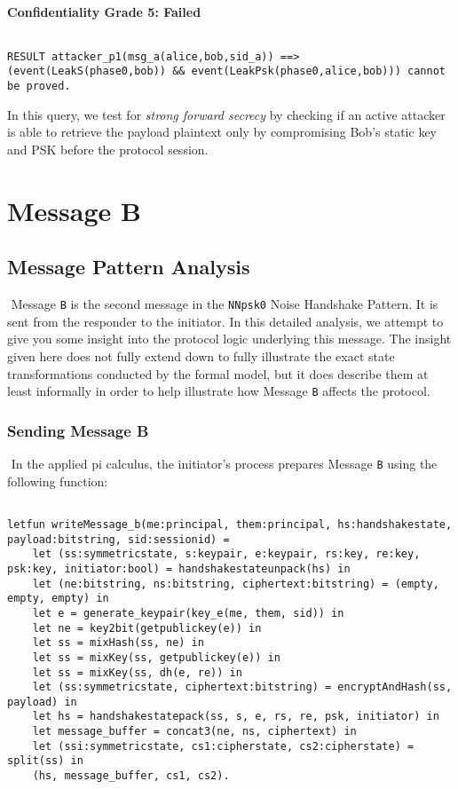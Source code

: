 \paragraph{Confidentiality Grade 5: Failed}$ $
\begin{lstlisting}
RESULT attacker_p1(msg_a(alice,bob,sid_a)) ==> (event(LeakS(phase0,bob)) && event(LeakPsk(phase0,alice,bob))) cannot be proved.
\end{lstlisting}

In this query, we test for \emph{strong forward secrecy} by checking if an active attacker is able to retrieve the payload plaintext only by compromising Bob's static key and PSK before the protocol session.


\section{ Message B}

\subsection{Message Pattern Analysis}$ $
Message \texttt{B} is the second message in the \texttt{NNpsk0} Noise Handshake Pattern. It is sent from the responder to the initiator. In this detailed analysis, we attempt to give you some insight into the protocol logic underlying this message. The insight given here does not fully extend down to fully illustrate the exact state transformations conducted by the formal model, but it does describe them at least informally in order to help illustrate how Message \texttt{B} affects the protocol.


\subsubsection{Sending Message B}$ $
In the applied pi calculus, the initiator's process prepares Message \texttt{B} using the following function:


\begin{lstlisting}

letfun writeMessage_b(me:principal, them:principal, hs:handshakestate, payload:bitstring, sid:sessionid) =
	let (ss:symmetricstate, s:keypair, e:keypair, rs:key, re:key, psk:key, initiator:bool) = handshakestateunpack(hs) in
	let (ne:bitstring, ns:bitstring, ciphertext:bitstring) = (empty, empty, empty) in
	let e = generate_keypair(key_e(me, them, sid)) in
	let ne = key2bit(getpublickey(e)) in
	let ss = mixHash(ss, ne) in
	let ss = mixKey(ss, getpublickey(e)) in
	let ss = mixKey(ss, dh(e, re)) in
	let (ss:symmetricstate, ciphertext:bitstring) = encryptAndHash(ss, payload) in
	let hs = handshakestatepack(ss, s, e, rs, re, psk, initiator) in
	let message_buffer = concat3(ne, ns, ciphertext) in
	let (ssi:symmetricstate, cs1:cipherstate, cs2:cipherstate) = split(ss) in
	(hs, message_buffer, cs1, cs2).

\end{lstlisting}

